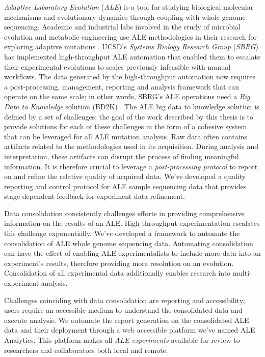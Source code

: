 \documentclass[12pt,final,masters,chapterheads]{ucsd}  %
\begin{document}
\textit{Adaptive Laboratory Evolution} (\textit{ALE}) is a tool for studying biological molecular mechanisms and evolutionary dynamics through coupling with whole genome sequencing. Academic and industrial labs involved in the study of microbial evolution and metabolic engineering use ALE methodologies in their research for exploring adaptive mutations \cite{ASM:/content/journal/microbe/10.1128/microbe.6.69.1}. UCSD's \textit{Systems Biology Research Group} (\textit{SBRG}) has implemented high-throughput ALE automation that enabled them to escalate their experimental evolutions to scales previously infeasible with manual workflows. The data generated by the high-throughput automation now requires a post-processing, management, reporting and analysis framework that can operate on the same scale; in other words, SBRG's ALE operations need a \textit{Big Data to Knowledge} solution (BD2K) \cite{Margolis957}. The ALE big data to knowledge solution is defined by a set of challenges; the goal of the work described by this thesis is to provide solutions for each of these challenges in the form of a cohesive system that can be leveraged for all ALE mutation analysis.
%
%
Raw data often contains artifacts related to the methodologies used in its acquisition. During analysis and interpretation, these artifacts can disrupt the process of finding meaningful information. It is therefore crucial to leverage a \textit{post-processing protocol} to report on and refine the relative quality of acquired data. We've developed a quality reporting and control protocol for ALE sample sequencing data that provides stage dependent feedback for experiment data refinement.

Data consolidation consistently challenges efforts in providing comprehensive information on the results of an ALE. High-throughput experimentation escalates this challenge exponentially. We've developed a framework to automate the consolidation of ALE whole genome sequencing data. Automating consolidation can have the effect of enabling ALE experimentalists to include more data into an experiment's results, therefore providing more resolution on an evolution. Consolidation of all experimental data additionally enables research into multi-experiment analysis.

Challenges coinciding with data consolidation are reporting and accessibility; users require an accessible medium to understand the consolidated data and execute analysis. We automate the report generation on the consolidated ALE data and their deployment through a web accessible platform we've named ALE Analytics. This platform makes all \textit{ALE experiments} available for review to researchers and collaborators both local and remote.
\end{document}
